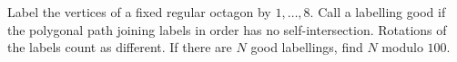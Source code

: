 Label the vertices of a fixed regular octagon by $1,\ldots,8$. Call a labelling good if the polygonal path joining labels in order has no self-intersection. Rotations of the labels count as different. If there are $N$ good labellings, find $N$ modulo $100$.

